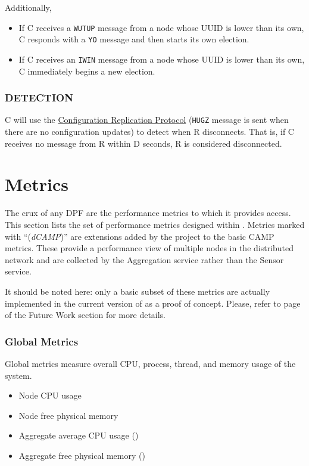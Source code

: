 Additionally,

\begin{itemize}
\item If C receives a \texttt{WUTUP} message from a node whose UUID is lower than its own, C responds with a \texttt{YO}
      message and then starts its own election.
\item If C receives an \texttt{IWIN} message from a node whose UUID is lower than its own, C immediately begins a new
      election.
\end{itemize}

\subsubsection{DETECTION}

C will use the \hyperref[proto_config]{Configuration Replication Protocol} (\texttt{HUGZ} message is sent when there are
no configuration updates) to detect when R disconnects. That is, if C receives no message from R within D seconds, R is
considered disconnected.

\section{\dcamp Metrics}
\label{dcamp_metrics}

The crux of any DPF are the performance metrics to which it provides access. This section lists the set of performance
metrics designed within \dcamp. Metrics marked with ``(\emph{dCAMP})'' are extensions added by the \dcamp project to the
basic CAMP metrics. These provide a performance view of multiple nodes in the distributed network and are collected by
the Aggregation service rather than the Sensor service.

It should be noted here: only a basic subset of these metrics are actually implemented in the current version of \dcamp
as a proof of concept. Please, refer to page \pageref{metric_extensions} of the Future Work section for more details.

\subsubsection{Global Metrics}
Global metrics measure overall CPU, process, thread, and memory usage of the system.
\begin{itemize}
\item Node CPU usage
\item Node free physical memory
\item Aggregate average CPU usage (\dcamp)
\item Aggregate free physical memory (\dcamp)
\end{itemize}

